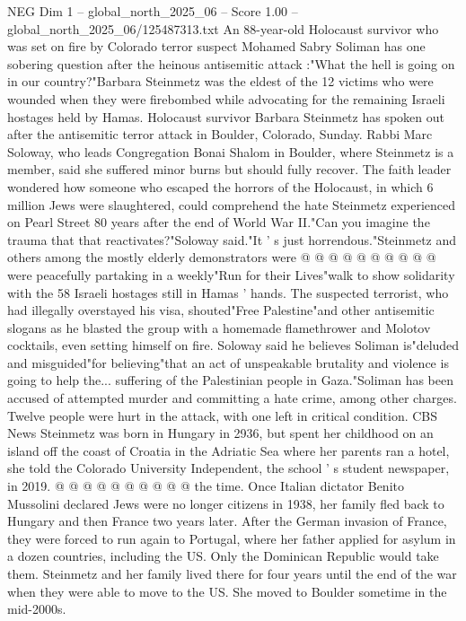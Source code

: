 \begin{textsample}{NEG Dim 1 – global\_north\_2025\_06 – Score 1.00 – global\_north\_2025\_06/125487313.txt}  \label{ex:f1_neg_118}
An 88-year-old Holocaust survivor who was set on fire by Colorado terror suspect Mohamed Sabry Soliman has one sobering question after the heinous antisemitic attack :"What the hell is going on in our country?"Barbara Steinmetz was the eldest of the 12 victims who were wounded when they were firebombed while advocating for the remaining Israeli hostages held by Hamas.
Holocaust survivor Barbara Steinmetz has spoken out after the antisemitic terror attack in Boulder, Colorado, Sunday.
Rabbi Marc Soloway, who leads Congregation Bonai Shalom in Boulder, where Steinmetz is a member, said she suffered minor burns but should fully recover.
The faith leader wondered how someone who escaped the horrors of the Holocaust, in which 6 million Jews were slaughtered, could comprehend the hate Steinmetz experienced on Pearl Street 80 years after the end of World War II."Can you imagine the trauma that that reactivates?"Soloway said."It ' s just horrendous."Steinmetz and others among the mostly elderly demonstrators were @ @ @ @ @ @ @ @ @ @ were peacefully partaking in a weekly"Run for their Lives"walk to show solidarity with the 58 Israeli hostages still in Hamas ' hands.
The suspected terrorist, who had illegally overstayed his visa, shouted"Free Palestine"and other antisemitic slogans as he blasted the group with a homemade flamethrower and Molotov cocktails, even setting himself on fire.
Soloway said he believes Soliman is"deluded and misguided"for believing"that an act of unspeakable brutality and violence is going to help the... suffering of the Palestinian people in Gaza."Soliman has been accused of attempted murder and committing a hate crime, among other charges.
Twelve people were hurt in the attack, with one left in critical condition.
CBS News Steinmetz was born in Hungary in 2936, but spent her childhood on an island off the coast of Croatia in the Adriatic Sea where her parents ran a hotel, she told the Colorado University Independent, the school ' s student newspaper, in 2019. @ @ @ @ @ @ @ @ @ @ the time.
Once Italian dictator Benito Mussolini declared Jews were no longer citizens in 1938, her family fled back to Hungary and then France two years later.
After the German invasion of France, they were forced to run again to Portugal, where her father applied for asylum in a dozen countries, including the US.
Only the Dominican Republic would take them.
Steinmetz and her family lived there for four years until the end of the war when they were able to move to the US.
She moved to Boulder sometime in the mid-2000s.

\end{textsample}
